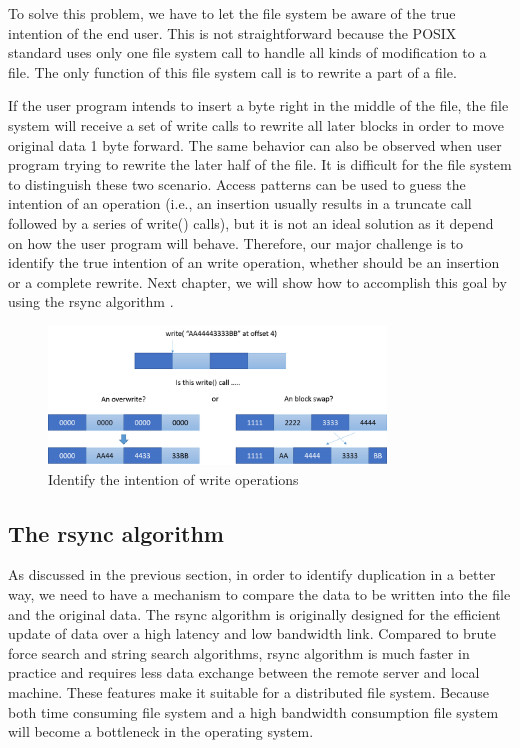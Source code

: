     To solve this problem, we have to let the file system be aware of the true intention of the end user. This is not straightforward because the POSIX standard uses only one file system call to handle all kinds of modification to a file. The only function of this file system call is to rewrite a part of a file.
    
    If the user program intends to insert a byte right in the middle of the file, the file system will receive a set of write calls to rewrite all later blocks in order to move original data 1 byte forward. The same behavior can also be observed when user program trying to rewrite the later half of the file. It is difficult for the file system to distinguish these two scenario. Access patterns can be used to guess the intention of an operation (i.e., an insertion usually results in a truncate call followed by a series of write() calls), but it is not an ideal solution as it depend on how the user program will behave. Therefore, our major challenge is to identify the true intention of an write operation, whether should be an insertion or a complete rewrite. Next chapter, we will show how to accomplish this goal by using the rsync algorithm \cite{rsync_alg}.

\begin{figure}[t]
\centering
\includegraphics[width=0.8\textwidth]{Chapter-4/figs/fig6.png}
\caption{Identify the intention of write operations}
\label{fig:write_intention}
\end{figure}

\subsection{The rsync algorithm}

    As discussed in the previous section, in order to identify duplication in a better way, we need to have a mechanism to compare the data to be written into the file and the original data. The rsync algorithm is originally designed for the efficient update of data over a high latency and low bandwidth link. Compared to brute force search and string search algorithms, rsync algorithm is much faster in practice and requires less data exchange between the remote server and local machine. These features make it suitable for a distributed file system. Because both time consuming file system and a high bandwidth consumption file system will become a bottleneck in the operating system.

